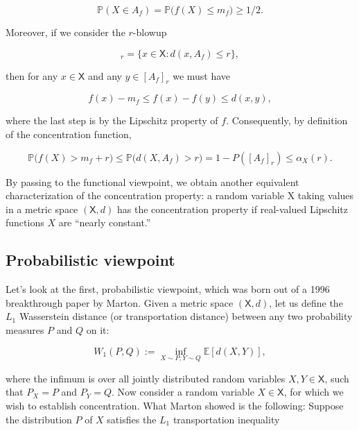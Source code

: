 \documentclass[12pt, oneside, a4paper]{article}
\theoremstyle{plain}
\theoremstyle{definition}
\begin{document}
\begin{equation*} \mathbb{P}(X \in A_f) = \mathbb{P}\Big( f(X) \le m_f \Big) \ge 1/2. \end{equation*}

Moreover, if we consider the $r$-blowup

\begin{equation*} [A_f]_r = \Big\{ x \in {\mathsf X}: d(x,A_f) \le r \Big\}, \end{equation*}

then for any $x \in \mathsf{X}$ and any $y \in [A_f]_r$ we must have

\begin{equation*} f(x) - m_f \le f(x) - f(y) \le d(x,y), \end{equation*}

where the last step is by the Lipschitz property of $f$. Consequently, by definition of the concentration function,

\begin{equation*}  {\mathbb P}\Big( f(X) > m_f + r \Big) \le {\mathbb P}\Big( d(X,A_f) > r \Big) = 1 - P\left([A_f]_r\right) \le \alpha_X(r). 
\end{equation*}

By passing to the functional viewpoint, we obtain another equivalent characterization of the concentration property: a random variable {X} taking values in a metric space $(\mathsf{X},d)$ has the concentration property if real-valued Lipschitz functions $X$ are “nearly constant.”
\subsection{Probabilistic viewpoint}
Let’s look at the first, probabilistic viewpoint, which was born out of a 1996 breakthrough paper by Marton\cite{
marton1996measure}. Given a metric space $(\mathsf{X},d)$, 
let us define the $L_1$ Wasserstein distance (or transportation distance) between any two probability measures $P$ and $Q$ on it:

\begin{equation*} W_1(P,Q) := \inf_{X \sim P, Y \sim Q} {\mathbb E}[d(X,Y)], \end{equation*}

where the infimum is over all jointly distributed random variables $X,Y \in \mathsf{X}$, such that $P_X = P$ and $P_Y = Q$. Now consider a random 
variable $X \in \mathsf{X}$, for which we wish to establish concentration. What Marton showed is the following: Suppose the distribution $P$ of $X$ 
satisfies the $L_1$ transportation inequality
\end{document}
